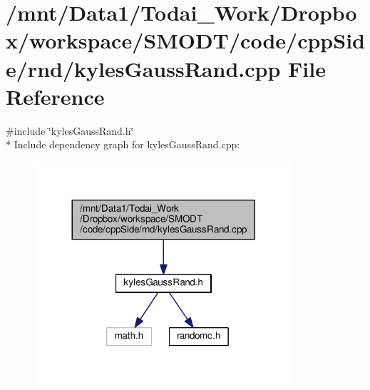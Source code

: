 \section{/mnt/\-Data1/\-Todai\-\_\-\-Work/\-Dropbox/workspace/\-S\-M\-O\-D\-T/code/cpp\-Side/rnd/kyles\-Gauss\-Rand.cpp File Reference}
\label{kyles_gauss_rand_8cpp}
{\ttfamily \#include \char`\"{}kyles\-Gauss\-Rand.\-h\char`\"{}}\\*
Include dependency graph for kyles\-Gauss\-Rand.\-cpp\-:\nopagebreak
\begin{figure}[H]
\begin{center}
\leavevmode
\includegraphics[width=272pt]{kyles_gauss_rand_8cpp__incl}
\end{center}
\end{figure}
